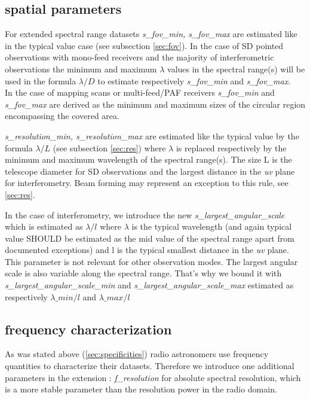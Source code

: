 \documentclass[11pt,a4paper]{ivoa}
\begin{document}
\subsection{spatial parameters}

For extended spectral range datasets \emph{s\_fov\_min, s\_fov\_max} are estimated like in the typical value case (see subsection \ref{sec:fov}).  
In the case of SD pointed observations with mono-feed receivers and the majority of interferometric observations the minimum and maximum
$\lambda$ values in the spectral range(s) will be used in the formula  $\lambda / D$ to estimate respectively \emph{s\_fov\_min} and  \emph{s\_fov\_max}. \\
In the case of mapping scans or multi-feed/PAF receivers \emph{ s\_fov\_min} and \emph{s\_fov\_max} are derived as the minimum and maximum sizes of the 
circular region encompassing the covered area.


\emph{s\_resolution\_min, s\_resolution\_max} are estimated like the typical value by the formula  $\lambda / L$  (see subsection \ref{sec:res}) where $\lambda$ is replaced respectively by the minimum and maximum wavelength of the spectral range(s). The size L is the telescope diameter for SD observations and the largest distance in the \emph{uv} plane for interferometry. Beam forming may represent an exception to this rule, see \ref{sec:res}.

In the case of interferometry, we introduce the new \emph{s\_largest\_angular\_scale} which is estimated as $\lambda/l$ where $\lambda$ is the typical
wavelength (and again typical value SHOULD be estimated as the mid value of the spectral range apart from documented exceptions) and l is the typical smallest distance in the \emph{uv} plane. This parameter is not relevant for other observation modes.
The largest angular scale is also variable along the spectral range. That's why we bound it with \emph{s\_largest\_angular\_scale\_min} and \emph{s\_largest\_angular\_scale\_max} estimated as  respectively $\lambda\_min/l$ and  $\lambda\_max/l$



\subsection{frequency characterization}

As was stated above (\ref{sec:specificities}) radio astronomers use frequency quantities to characterize their datasets. Therefore we introduce one additional parameters in the extension : 
\emph{f\_resolution} for absolute spectral resolution, which is a more stable parameter than the resolution power in the radio domain.
\end{document}

